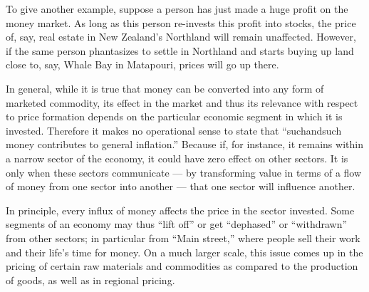 \documentclass[aps,rmp,preprint,amsfonts,showpacs,showkeys]{revtex4}
\begin{document}
To give another example, suppose a person has just made a huge profit on the money market.
As long as this person re-invests this profit into stocks, the price of,
say, real estate in New Zealand's Northland will remain unaffected. However, if the same person
phantasizes to settle in Northland and starts buying up land close to, say, Whale Bay in Matapouri, prices will go up there.

In general, while it is true that money can be converted into any form of marketed commodity,
its effect in the market and thus its relevance with respect to price formation depends on
the particular economic segment in which it is invested.
Therefore it makes no operational sense to state that ``suchandsuch money contributes to general inflation.''
Because if, for instance, it remains within a narrow sector of the economy, it could have zero effect on other sectors.
It is only when these sectors communicate --- by transforming value in terms of a flow of money from one sector into another ---
that one sector will influence another.

In principle, every influx of money affects the price in the sector invested.
Some segments of an economy may thus ``lift off'' or get ``dephased'' or ``withdrawn'' from other
sectors; in particular from ``Main street,'' where people sell their work and their life's time for money.
On a much larger scale, this issue comes up in the pricing of certain raw materials and commodities as compared to
the production of goods, as well as in regional pricing.
\end{document}
